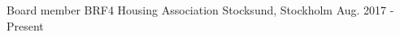 



\begin{cvhonors}


\cvhonor
{Board member} %
{BRF4 Housing Association} %
{Stocksund, Stockholm} %
{Aug. 2017 - Present} %

\end{cvhonors}